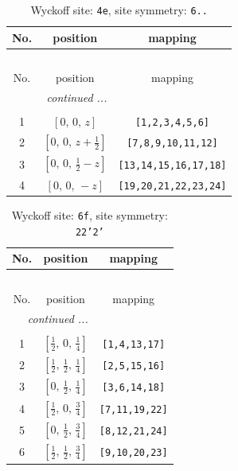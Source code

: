 \documentclass[fleqn,8pt]{jsarticle}
\begin{document}
\renewcommand{\arraystretch}{1.2}
\begin{longtable}{ccc}
\caption{Wyckoff site: {\tt 4e}, site symmetry: {\tt 6..}}
 \\
 \hline \hline
No. & position & mapping \\ \hline \endfirsthead

\multicolumn{2}{l}{\tablename\ \thetable{}} \\
 \hline \hline
No. & position & mapping \\ \hline \endhead

 \hline \hline
\multicolumn{2}{r}{\footnotesize\it continued ...} \\ \endfoot

 \hline \hline
\multicolumn{2}{r}{} \\ \endlastfoot

1 & $\left[ 0,\, 0,\, z \right]$ & {\tt [1,2,3,4,5,6]} \\ \hline
2 & $\left[ 0,\, 0,\, z + \frac{1}{2} \right]$ & {\tt [7,8,9,10,11,12]} \\ \hline
3 & $\left[ 0,\, 0,\, \frac{1}{2} - z \right]$ & {\tt [13,14,15,16,17,18]} \\ \hline
4 & $\left[ 0,\, 0,\, - z \right]$ & {\tt [19,20,21,22,23,24]} \\
\end{longtable}
\renewcommand{\arraystretch}{1.2}
\begin{longtable}{ccc}
\caption{Wyckoff site: {\tt 6f}, site symmetry: {\tt 22'2'}}
 \\
 \hline \hline
No. & position & mapping \\ \hline \endfirsthead

\multicolumn{2}{l}{\tablename\ \thetable{}} \\
 \hline \hline
No. & position & mapping \\ \hline \endhead

 \hline \hline
\multicolumn{2}{r}{\footnotesize\it continued ...} \\ \endfoot

 \hline \hline
\multicolumn{2}{r}{} \\ \endlastfoot

1 & $\left[ \frac{1}{2},\, 0,\, \frac{1}{4} \right]$ & {\tt [1,4,13,17]} \\ \hline
2 & $\left[ \frac{1}{2},\, \frac{1}{2},\, \frac{1}{4} \right]$ & {\tt [2,5,15,16]} \\ \hline
3 & $\left[ 0,\, \frac{1}{2},\, \frac{1}{4} \right]$ & {\tt [3,6,14,18]} \\ \hline
4 & $\left[ \frac{1}{2},\, 0,\, \frac{3}{4} \right]$ & {\tt [7,11,19,22]} \\ \hline
5 & $\left[ 0,\, \frac{1}{2},\, \frac{3}{4} \right]$ & {\tt [8,12,21,24]} \\ \hline
6 & $\left[ \frac{1}{2},\, \frac{1}{2},\, \frac{3}{4} \right]$ & {\tt [9,10,20,23]} \\
\end{longtable}
\end{document}
